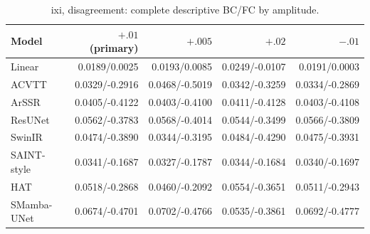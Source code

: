 \begin{table}[t]\centering\scriptsize

\caption{ixi, disagreement: complete descriptive BC/FC by amplitude.}

\begin{tabular}{lrrrr}\toprule Model & $+.01$ (primary) & $+.005$ & $+.02$ & $-.01$\\\midrule

Linear & 0.0189/0.0025 & 0.0193/0.0085 & 0.0249/-0.0107 & 0.0191/0.0003\\

ACVTT & 0.0329/-0.2916 & 0.0468/-0.5019 & 0.0342/-0.3259 & 0.0334/-0.2869\\

ArSSR & 0.0405/-0.4122 & 0.0403/-0.4100 & 0.0411/-0.4128 & 0.0403/-0.4108\\

ResUNet & 0.0562/-0.3783 & 0.0568/-0.4014 & 0.0544/-0.3499 & 0.0566/-0.3809\\

SwinIR & 0.0474/-0.3890 & 0.0344/-0.3195 & 0.0484/-0.4290 & 0.0475/-0.3931\\

SAINT-style & 0.0341/-0.1687 & 0.0327/-0.1787 & 0.0344/-0.1684 & 0.0340/-0.1697\\

HAT & 0.0518/-0.2868 & 0.0460/-0.2092 & 0.0554/-0.3651 & 0.0511/-0.2943\\

SMamba-UNet & 0.0674/-0.4701 & 0.0702/-0.4766 & 0.0535/-0.3861 & 0.0692/-0.4777\\

\bottomrule\end{tabular}\end{table}

